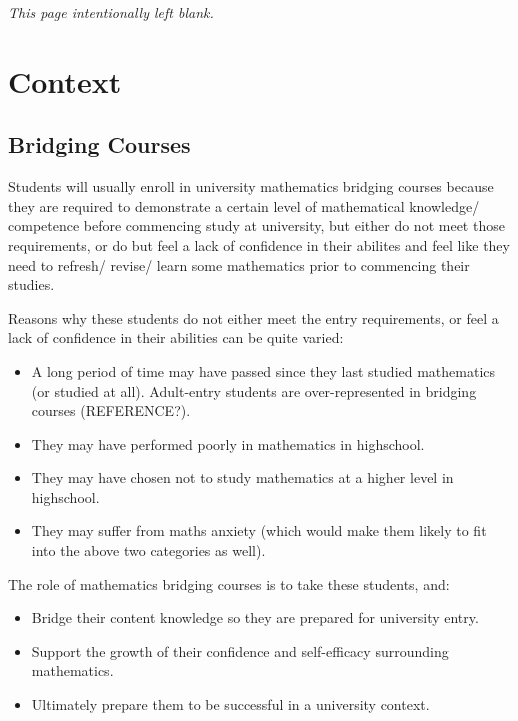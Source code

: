 \documentclass[twoside,12pt,a4paper]{report}
\makeatletter
\newcommand*{\intentionallyblankpage}{
  \vspace*{\fill}
  {\centering \textit{This page intentionally left blank.} \par}
  \vspace{\fill}}
\renewcommand*{\cleardoublepage}{\clearpage\if@twoside \ifodd\c@page\else
  \intentionallyblankpage
  \newpage
  \if@twocolumn\hbox{}\newpage\fi\fi\fi}
\makeatother
\begin{document}
\cleardoublepage
\chapter{Context}


\section{Bridging Courses}
\label{sec:generalcontext}

Students will usually enroll in university mathematics bridging courses because they are required to demonstrate a certain level of mathematical knowledge/ competence before commencing study at university, but either do not meet those requirements, or do but feel a lack of confidence in their abilites and feel like they need to refresh/ revise/ learn some mathematics prior to commencing their studies.

Reasons why these students do not either meet the entry requirements, or feel a lack of confidence in their abilities can be quite varied:
\begin{itemize}
	\item A long period of time may have passed since they last studied mathematics (or studied at all). Adult-entry students are over-represented in bridging courses (REFERENCE?).
	\item They may have performed poorly in mathematics in highschool.
	\item They may have chosen not to study mathematics at a higher level in highschool.
	\item They may suffer from maths anxiety (which would make them likely to fit into the above two categories as well).
\end{itemize}
	
The role of mathematics bridging courses is to take these students, and:
\begin{itemize}
	\item Bridge their content knowledge so they are prepared for university entry.
	\item Support the growth of their confidence and self-efficacy surrounding mathematics.
	\item Ultimately prepare them to be successful in a university context.
\end{itemize}
\end{document}
